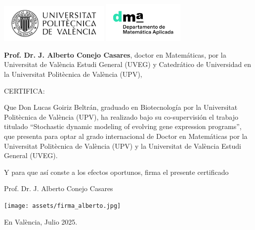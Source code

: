 \documentclass[11pt]{book}
\theoremstyle{definition}
\begin{document}
\vfill

\pagebreak ~

\chapter*{}
\vspace{-4cm}

\begin{flushright}
\includegraphics[width=0.4\textwidth]{assets/upv_logo.png}
\includegraphics[width=0.3\textwidth]{assets/dma_logo.jpg}
\end{flushright}

\vspace{0.5cm}

\noindent\textbf{Prof. Dr. J. Alberto Conejo Casares}, doctor en Matemáticas, por la Universitat de València Estudi General (UVEG) y Catedrático de Universidad en la Universitat Politècnica de València (UPV),

\vspace{1.5cm}

CERTIFICA:

\vspace{1.5cm}

\noindent Que Don Lucas Goiriz Beltrán, graduado en Biotecnología por la Universitat Politècnica de València (UPV), ha realizado bajo su co-supervisión el trabajo titulado
``Stochastic dynamic modeling of evolving gene expression programs'', que presenta para optar al grado internacional de Doctor en Matemáticas por la Universitat Politècnica de València (UPV) y la Universitat de València Estudi General (UVEG).

\vspace{1cm}

Y para que así conste a los efectos oportunos, firma el presente certificado

\vspace{1cm}


\begin{center}
Prof. Dr. J. Alberto Conejo Casares

\texttt{[image: assets/firma\_alberto.jpg]}

En València, Julio 2025.

\end{center}
\end{document}
